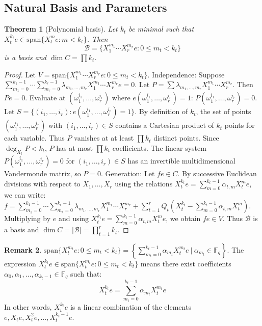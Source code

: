 \documentclass[10pt,twocolumn]{IEEEtran}
\theoremstyle{plain}
\newtheorem{thm}{Theorem}[section]
\theoremstyle{definition}
\newtheorem{rem}[thm]{Remark}
\newcommand{\Fq}{\mathbb{F}_q}
\begin{document}
\subsection{Natural Basis and Parameters}
\begin{thm}[Polynomial basis]\label{thm:basis}
Let $k_t$ be minimal such that $X_t^{k_t} e \in \mathrm{span}\{X_t^m e : m < k_t\}$. Then
\[
\mathcal{B} = \{ X_1^{m_1}\cdots X_r^{m_r} e : 0\le m_t < k_t \}
\]
is a basis and $\dim C = \prod k_t$.
\end{thm}
\begin{proof}
Let $V = \mathrm{span}\{ X_1^{m_1} \cdots X_r^{m_r} e : 0 \le m_t < k_t \}$.
Independence: Suppose $\sum_{m_1=0}^{k_1-1} \cdots \sum_{m_r=0}^{k_r-1} \lambda_{m_1,\dots,m_r} X_1^{m_1} \cdots X_r^{m_r} e = 0$.
Let $P = \sum \lambda_{m_1,\dots,m_r} X_1^{m_1} \cdots X_r^{m_r}$. Then $P e = 0$. Evaluate at $(\omega_1^{i_1},\dots,\omega_r^{i_r})$ where $e(\omega_1^{i_1},\dots,\omega_r^{i_r}) = 1$:
$P(\omega_1^{i_1},\dots,\omega_r^{i_r}) = 0$.
Let $S = \{(i_1,\dots,i_r) : e(\omega_1^{i_1},\dots,\omega_r^{i_r}) = 1\}$. By definition of $k_t$, the set of points $(\omega_1^{i_1},\dots,\omega_r^{i_r})$ with $(i_1,\dots,i_r) \in S$ contains a Cartesian product of $k_t$ points for each variable. Thus $P$ vanishes at at least $\prod k_t$ distinct points. Since $\deg_{X_t} P < k_t$, $P$ has at most $\prod k_t$ coefficients. The linear system $P(\omega_1^{i_1},\dots,\omega_r^{i_r}) = 0$ for $(i_1,\dots,i_r) \in S$ has an invertible multidimensional Vandermonde matrix, so $P = 0$.
Generation: Let $f e \in C$. By successive Euclidean divisions with respect to $X_1,\dots,X_r$ using the relations $X_t^{k_t} e = \sum_{m=0}^{k_t-1} \alpha_{t,m} X_t^m e$, we can write:
$f = \sum_{m_1=0}^{k_1-1} \cdots \sum_{m_r=0}^{k_r-1} \lambda_{m_1,\dots,m_r} X_1^{m_1} \cdots X_r^{m_r} + \sum_{t=1}^r Q_t (X_t^{k_t} - \sum_{m=0}^{k_t-1} \alpha_{t,m} X_t^m)$.
Multiplying by $e$ and using $X_t^{k_t} e = \sum_{m=0}^{k_t-1} \alpha_{t,m} X_t^m e$, we obtain $f e \in V$.
Thus $\mathcal{B}$ is a basis and $\dim C = |\mathcal{B}| = \prod_{t=1}^r k_t$.
\end{proof}

\begin{rem}
$\mathrm{span}\{ X_t^{m_t} e : 0 \le m_t < k_t \} = \left\{ \sum_{m_t=0}^{k_t-1} \alpha_{m_t} X_t^{m_t} e \ \Bigg|\ \alpha_{m_t} \in \Fq \right\}$.
The expression $X_t^{k_t} e \in \mathrm{span}\{ X_t^{m_t} e : 0 \le m_t < k_t \}$ means there exist coefficients $\alpha_0, \alpha_1, \dots, \alpha_{k_t-1} \in \Fq$ such that:
\[
X_t^{k_t} e = \sum_{m_t=0}^{k_t-1} \alpha_{m_t} X_t^{m_t} e
\]
In other words, $X_t^{k_t} e$ is a linear combination of the elements $e, X_t e, X_t^2 e, \dots, X_t^{k_t-1} e$.
\end{rem}
\end{document}
